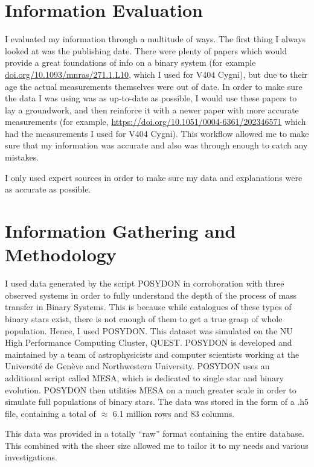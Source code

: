 \documentclass[12pt, a4paper]{article}
\begin{document}
\section{Information Evaluation}
    I evaluated my information through a multitude of ways. The first thing I always looked at was the publishing date. There were plenty of papers which would provide a great foundations of info on a binary system (for example \url{doi.org/10.1093/mnras/271.1.L10}, which I used for V404 Cygni), but due to their age the actual measurements themselves were out of date. In order to make sure the data I was using was as up-to-date as possible, I would use these papers to lay a groundwork, and then reinforce it with a newer paper with more accurate measurements (for example, \url{https://doi.org/10.1051/0004-6361/202346571} which had the measurements I used for V404 Cygni). This workflow allowed me to make sure that my information was accurate and also was through enough to catch any mistakes.

    I only used expert sources in order to make sure my data and explanations were as accurate as possible.

\section{Information Gathering and Methodology}
    I used data generated by the script POSYDON in corroboration with three observed systems in order to fully understand the depth of the process of mass transfer in Binary Systems. This is because while catalogues of these types of binary stars exist, there is not enough of them to get a true grasp of whole population. Hence, I used POSYDON. This dataset was simulated on the NU High Performance Computing Cluster, QUEST. POSYDON is developed and maintained by a team of astrophysicists and computer scientists working at the Université de Genève and Northwestern University. POSYDON uses an additional script called MESA, which is dedicated to single star and binary evolution. POSYDON then utilities MESA on a much greater scale in order to simulate full populations of binary stars. The data was stored in the form of a .h5 file, containing a total of $\approx$ 6.1 million rows and 83 columns.

    This data was provided in a totally ``raw'' format containing the entire database. This combined with the sheer size allowed me to tailor it to my needs and various investigations.  
\end{document}
